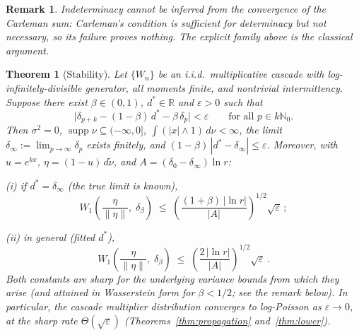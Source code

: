\documentclass[pdflatex,sn-mathphys-num]{sn-jnl}
\theoremstyle{thmstyleone}
\newtheorem{theorem}{Theorem}
\theoremstyle{thmstyletwo}
\newtheorem*{remark}{Remark}
\theoremstyle{thmstylethree}
\DeclareMathOperator{\supp}{supp}
\begin{document}
\begin{remark}
Indeterminacy cannot be inferred from the convergence of the
Carleman sum: Carleman's condition is sufficient for determinacy but
not necessary, so its failure proves nothing.  The explicit family
above is the classical argument.
\end{remark}


\begin{theorem}[Stability]\label{thm:stability}
Let $\{W_n\}$ be an i.i.d.\ multiplicative cascade with
log-infinitely-divisible generator, all moments finite, and
nontrivial intermittency.  Suppose there exist $\beta \in (0,1)$,
$d^* \in \mathbb{R}$ and $\varepsilon > 0$ such that
\[
  \bigl|\delta_{p+k} - (1-\beta)\,d^* - \beta\,\delta_p\bigr|
  < \varepsilon
  \qquad\text{for all } p \in k\mathbb{N}_0 .
\]
Then $\sigma^2 = 0$, $\supp\nu \subseteq (-\infty,0]$,
$\int(|x|\wedge1)\,d\nu < \infty$, the limit $\delta_\infty :=
\lim_{p\to\infty}\delta_p$ exists finitely, and
$(1-\beta)\,|d^* - \delta_\infty| \le \varepsilon$.  Moreover, with
$u = e^{kx}$, $\eta = (1-u)\,d\tilde\nu$, and
$A = (\delta_0 - \delta_\infty)\ln r$:

\textup{(i)} if $d^* = \delta_\infty$ (the true limit is known),
\[
  W_1\!\left(\frac{\eta}{\|\eta\|},\;\delta_\beta\right)
  \;\leq\;
  \left(\frac{(1+\beta)\,|\ln r|}{|A|}\right)^{\!1/2}
  \!\sqrt{\varepsilon}\,;
\]

\textup{(ii)} in general (fitted $d^*$),
\[
  W_1\!\left(\frac{\eta}{\|\eta\|},\;\delta_\beta\right)
  \;\leq\;
  \left(\frac{2\,|\ln r|}{|A|}\right)^{\!1/2}
  \!\sqrt{\varepsilon}\,.
\]
Both constants are sharp for the underlying variance bounds from
which they arise (and attained in Wasserstein form for
$\beta < 1/2$; see the remark below).  In
particular, the cascade multiplier distribution converges to
log-Poisson as $\varepsilon \to 0$, at the sharp rate
$\Theta(\sqrt\varepsilon)$
(Theorems~\ref{thm:propagation} and~\ref{thm:lower}).
\end{theorem}
\end{document}
